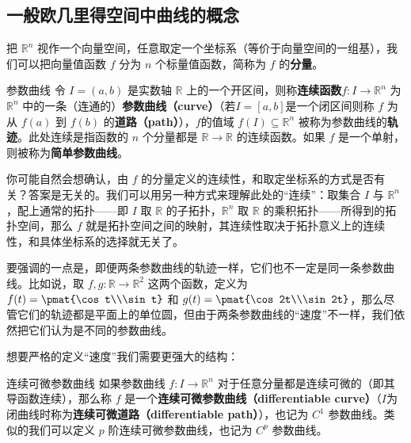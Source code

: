


\subsection{一般欧几里得空间中曲线的概念}

把 $\mathbb{R}^n$ 视作一个向量空间，任意取定一个坐标系（等价于向量空间的一组基），我们可以把向量值函数 $f$ 分为 $n$ 个标量值函数，简称为 $f$ 的\textbf{分量}。

\begin{definition}{参数曲线}
令 $I = (a, b)$ 是实数轴 $\mathbb{R}$ 上的一个开区间，则称\textbf{连续函数}$f:I\to \mathbb{R}^n$ 为 $\mathbb{R}^n$ 中的一条（连通的）\textbf{参数曲线（curve）}（若$I = [a, b]$是一个闭区间则称 $f$ 为从 $f(a)$ 到 $f(b)$ 的\textbf{道路（path）}），$f$的值域 $f(I) \subseteq \mathbb{R}^n$ 被称为参数曲线的\textbf{轨迹}。此处连续是指函数的 $n$ 个分量都是 $\mathbb{R}\to\mathbb{R}$ 的连续函数。如果 $f$ 是一个单射，则被称为\textbf{简单参数曲线}。
\end{definition}

你可能自然会想确认，由 $f$ 的分量定义的连续性，和取定坐标系的方式是否有关？答案是无关的。我们可以用另一种方式来理解此处的“连续”：取集合 $I$ 与 $\mathbb{R}^n$，配上通常的拓扑——即 $I$ 取 $\mathbb{R}$ 的子拓扑，$\mathbb{R}^n$ 取 $\mathbb{R}$ 的乘积拓扑——所得到的拓扑空间，那么 $f$ 就是拓扑空间之间的映射，其连续性取决于拓扑意义上的连续性，和具体坐标系的选择就无关了。

要强调的一点是，即便两条参数曲线的轨迹一样，它们也不一定是同一条参数曲线。比如说，取 $f, g:\mathbb{R}\to\mathbb{R}^2$ 这两个函数，定义为 $f(t)=\pmat{\cos t\\\sin t}$ 和 $g(t)=\pmat{\cos 2t\\\sin 2t}$，那么尽管它们的轨迹都是平面上的单位圆，但由于两条参数曲线的“速度”不一样，我们依然把它们认为是不同的参数曲线。

想要严格的定义“速度”我们需要更强大的结构：

\begin{definition}{连续可微参数曲线}
如果参数曲线 $f: I \to \mathbb{R}^n$ 对于任意分量都是连续可微的（即其导函数连续），那么称 $f$ 是一个\textbf{连续可微参数曲线（differentiable curve）}（$I$为闭曲线时称为\textbf{连续可微道路（differentiable path）}），也记为 $C^1$ 参数曲线。类似的我们可以定义 $p$ 阶连续可微参数曲线，也记为 $C^p$ 参数曲线。
\end{definition}

